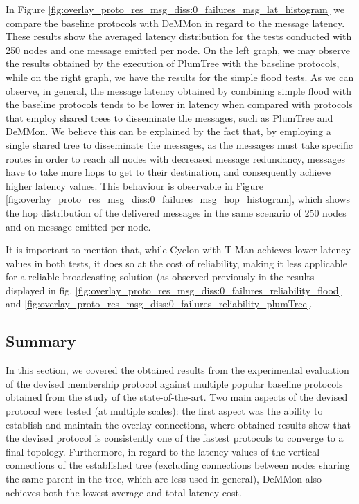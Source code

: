 In Figure \ref{fig:overlay_proto_res_msg_diss:0_failures_msg_lat_histogram} we compare the baseline protocols with DeMMon in regard to the message latency. These results show the averaged latency distribution for the tests conducted with 250 nodes and one message emitted per node. On the left graph, we may observe the results obtained by the execution of PlumTree with the baseline protocols, while on the right graph, we have the results for the simple flood tests. As we can observe, in general, the message latency obtained by combining simple flood with the baseline protocols tends to be lower in latency when compared with protocols that employ shared trees to disseminate the messages, such as PlumTree and DeMMon. We believe this can be explained by the fact that, by employing a single shared tree to disseminate the messages, as the messages must take specific routes in order to reach all nodes with decreased message redundancy, messages have to take more hops to get to their destination, and consequently achieve higher latency values. This behaviour is observable in Figure \ref{fig:overlay_proto_res_msg_diss:0_failures_msg_hop_histogram}, which shows the hop distribution of the delivered messages in the same scenario of 250 nodes and on message emitted per node.

It is important to mention that, while Cyclon with T-Man achieves lower latency values in both tests, it does so at the cost of reliability, making it less applicable for a reliable broadcasting solution (as observed previously in the results displayed in fig. \ref{fig:overlay_proto_res_msg_diss:0_failures_reliability_flood} and \ref{fig:overlay_proto_res_msg_diss:0_failures_reliability_plumTree}.


\subsection{Summary}

In this section, we covered the obtained results from the experimental evaluation of the devised membership protocol against multiple popular baseline protocols obtained from the study of the state-of-the-art. Two main aspects of the devised protocol were tested (at multiple scales): the first aspect was the ability to establish and maintain the overlay connections, where obtained results show that the devised protocol is consistently one of the fastest protocols to converge to a final topology. Furthermore, in regard to the latency values of the vertical connections of the established tree (excluding connections between nodes sharing the same parent in the tree, which are less used in general), DeMMon also achieves both the lowest average and total latency cost.

